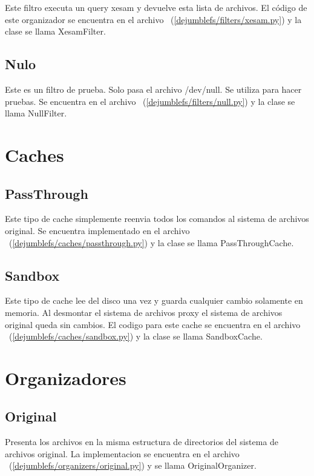 Este filtro executa un query xesam y devuelve esta lista de archivos. El código de este organizador se encuentra en el archivo ~(\ref{dejumblefs/filters/xesam.py}) y la clase se llama XesamFilter.

\subsection{Nulo}

Este es un filtro de prueba. Solo pasa el archivo /dev/null. Se utiliza para hacer pruebas. Se encuentra en el archivo ~(\ref{dejumblefs/filters/null.py}) y la clase se llama NullFilter.


\section{Caches}

\subsection{PassThrough}

Este tipo de cache simplemente reenvia todos los comandos al sistema de archivos original. Se encuentra implementado en el archivo ~(\ref{dejumblefs/caches/passthrough.py}) y la clase se llama PassThroughCache.

\subsection{Sandbox}

Este tipo de cache lee del disco una vez y guarda cualquier cambio solamente en memoria. Al desmontar el sistema de archivos proxy el sistema de archivos original queda sin cambios. El codigo para este cache se encuentra en el archivo ~(\ref{dejumblefs/caches/sandbox.py}) y la clase se llama SandboxCache.


\section{Organizadores}

\subsection{Original}

Presenta los archivos en la misma estructura de directorios del sistema de archivos original. La implementacion se encuentra en el archivo ~(\ref{dejumblefs/organizers/original.py}) y se llama OriginalOrganizer.

